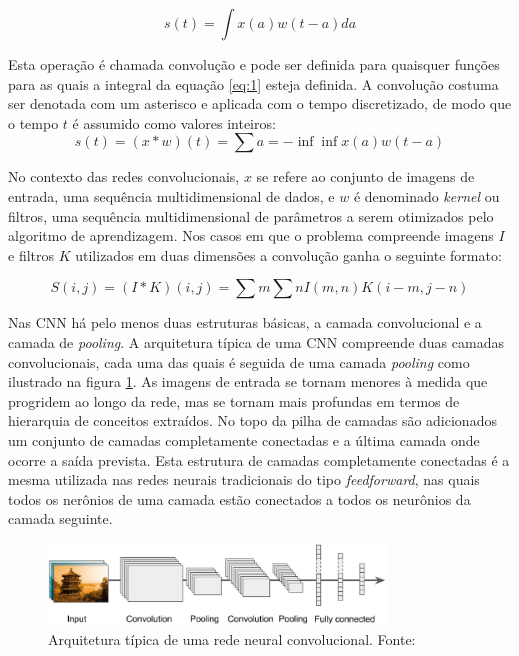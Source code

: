 \begin{equation}
 s(t) = \int{x(a) w(t-a)da}
 \label{eq:1}
\end{equation}

Esta operação é chamada convolução e pode ser definida para quaisquer
funções para as quais a integral da equação \ref{eq:1} esteja definida. A convolução
costuma ser denotada com um asterisco e aplicada com
o tempo discretizado, de modo que o tempo $t$ é assumido como valores inteiros:
\begin{equation}
 s(t) = (x * w)(t) = \sum{a=-\inf}{\inf}{x(a)w(t-a)}
 \label{eq:2}
\end{equation}

No contexto das redes convolucionais, $x$ se refere ao conjunto de imagens de entrada, uma sequência multidimensional
de dados, e $w$ é denominado \textit{kernel} ou filtros, uma sequência multidimensional de parâmetros 
a serem otimizados pelo algoritmo de aprendizagem.
Nos casos em que o problema compreende imagens $I$ e filtros $K$ utilizados em duas dimensões
a convolução ganha o seguinte formato:

\begin{equation}
 S(i,j) = (I*K)(i,j) = \sum{m}\sum{n}{I(m,n)K(i-m,j-n)}
\end{equation}

Nas CNN há pelo menos duas estruturas básicas, a camada convolucional e a camada de \textit{pooling}.
A arquitetura típica de uma CNN compreende duas camadas convolucionais, cada uma das quais é seguida de
uma camada \textit{pooling} como ilustrado na figura \ref{fig:cnn_basic_arq}. As imagens 
de entrada se tornam menores à medida que progridem ao longo da rede,
mas se tornam mais profundas em termos de hierarquia de conceitos extraídos. No topo da pilha de camadas
são adicionados um conjunto de camadas completamente conectadas e a última camada onde ocorre
a saída prevista. Esta estrutura de camadas completamente
conectadas é a mesma utilizada nas redes neurais tradicionais do tipo \textit{feedforward}, nas quais todos
os nerônios de uma camada estão conectados a todos os neurônios da camada seguinte. 
\begin{figure}[htp]
\begin{center}
  \includegraphics[width=0.8\textwidth]{fig/cnn_basic_arq}
  \caption{Arquitetura típica de uma rede neural convolucional. Fonte:\cite{aurelien17}}
  \label{fig:cnn_basic_arq}
\end{center}
\end{figure}

